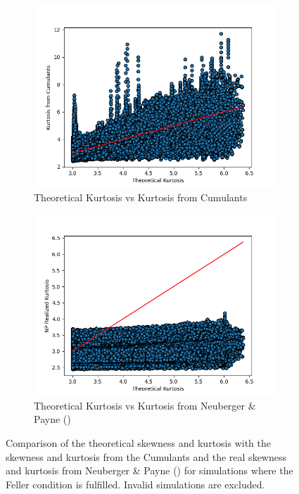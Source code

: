 \begin{figure}
\begin{subfigure}[b]{0.4\textwidth}
    \end{subfigure}
    \bigskip %
    \begin{subfigure}[b]{0.4\textwidth}
        \centering
        \includegraphics[width=\textwidth]{img/theoretical_kurtosis_vs_kurtosis_from_cumulants_feller_condition_true.png}
        \caption{Theoretical Kurtosis vs Kurtosis from Cumulants}
    \end{subfigure}
    \hfill
    \begin{subfigure}[b]{0.4\textwidth}
        \centering
        \includegraphics[width=\textwidth]{img/theoretical_kurtosis_vs_NP_rexcess_kurtosis_feller_condition_true.png}
        \caption{Theoretical Kurtosis vs Kurtosis from Neuberger \& Payne (\citeyear{neubergerSkewnessStockMarket2021})}
    \end{subfigure}
    \caption{Comparison of the theoretical skewness and kurtosis with the skewness and kurtosis from the Cumulants and the real skewness and kurtosis from Neuberger \& Payne (\citeyear{neubergerSkewnessStockMarket2021}) for simulations where the Feller condition is fulfilled. Invalid simulations are excluded.}
    \label{fig:theoretical_vs_real_skewness_kurtosis}
\end{figure}

